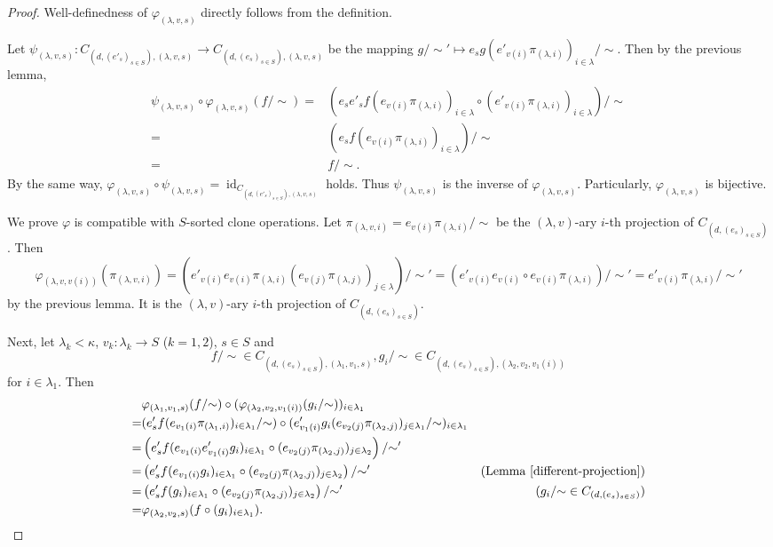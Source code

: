 \documentclass[a4paper,10pt]{article}
\theoremstyle{definition}
\newcommand\ph{\varphi}
\newcommand\ra{\rightarrow}
\DeclareMathOperator{\id}{id}
\newcommand\mc{\mathclose}
\begin{document}
\begin{proof}
Well-definedness of $\ph_{(\lambda,v,s)}$ directly follows from the definition.

Let $\psi_{(\lambda,v,s)}:C_{(d,(e'_s)_{s\in S}),(\lambda,v,s)}\ra
C_{(d,(e_s)_{s\in S}),(\lambda,v,s)}$ be the mapping
$g/\mc\sim'\mapsto e_sg(e'_{v(i)}\pi_{(\lambda,i)})_{i\in\lambda}/\mc\sim$.
Then by the previous lemma,
\begin{align*}
\psi_{(\lambda,v,s)}\circ \ph_{(\lambda,v,s)}(f/\mc\sim)
=&\left(e_se'_sf(e_{v(i)}\pi_{(\lambda,i)})_{i\in\lambda}
  \circ(e'_{v(i)}\pi_{(\lambda,i)})_{i\in\lambda}\right)/\mc\sim\\
=&\left(e_sf(e_{v(i)}\pi_{(\lambda,i)})_{i\in\lambda}\right)/\mc\sim\\
=&f/\mc\sim.
\end{align*}
By the same way,
$\ph_{(\lambda,v,s)}\circ \psi_{(\lambda,v,s)}=
\id_{C_{(d,(e'_s)_{s\in S}),(\lambda,v,s)}}$
holds. Thus $\psi_{(\lambda,v,s)}$ is the inverse of $\ph_{(\lambda,v,s)}$.
Particularly, $\ph_{(\lambda,v,s)}$ is bijective.


We prove $\ph$ is compatible with $S$-sorted clone operations.
Let $\pi_{(\lambda,v,i)}=e_{v(i)}\pi_{(\lambda,i)}/\mc\sim$ be the
$(\lambda,v)$-ary $i$-th projection of $C_{(d,(e_s)_{s\in S})}$.
Then
\[
\ph_{(\lambda,v,v(i))}(\pi_{(\lambda,v,i)})
=\left(e'_{v(i)}e_{v(i)}\pi_{(\lambda,i)}(e_{v(j)}\pi_{(\lambda,j)})_{j\in\lambda}\right)/\mc\sim'
=(e'_{v(i)}e_{v(i)}\circ e_{v(i)}\pi_{(\lambda,i)})/\mc\sim'
=e'_{v(i)}\pi_{(\lambda,i)}/\mc\sim'
\]
by the previous lemma.
It is the $(\lambda,v)$-ary $i$-th projection of $C_{(d,(e_s)_{s\in S})}$.

Next, let $\lambda_k<\kappa$, $v_k:\lambda_k\ra S$ ($k=1,2$),
$s\in S$ and 
\[
f/\mc\sim\in C_{(d,(e_s)_{s\in S}),(\lambda_1,v_1,s)},
g_i/\mc\sim\in C_{(d,(e_s)_{s\in S}),(\lambda_2,v_2,v_1(i))}
\]
for $i\in\lambda_1$.
Then
\begin{align*}
&\ph_{(\lambda_1,v_1,s)}(f/\mc\sim)
 \circ (\ph_{(\lambda_2,v_2,v_1(i))}(g_i/\mc\sim))_{i\in\lambda_1}&\\
=&(e'_sf(e_{v_1(i)}\pi_{(\lambda_1,i)})_{i\in\lambda_1}/\mc\sim)\circ 
 (e'_{v_1(i)}g_i(e_{v_2(j)}\pi_{(\lambda_2,j)})_{j\in\lambda_1}/\mc\sim)_{i\in\lambda_1}&\\
=&\left(e'_sf(e_{v_1(i)}e'_{v_1(i)}g_i)_{i\in\lambda_1}\circ 
  (e_{v_2(j)}\pi_{(\lambda_2,j)})_{j\in\lambda_2}\right)/\mc\sim'&\\
=&\left(e'_sf(e_{v_1(i)}g_i)_{i\in\lambda_1}\circ 
  (e_{v_2(j)}\pi_{(\lambda_2,j)})_{j\in\lambda_2}\right)/\mc\sim'
  &(\text{Lemma \ref{different-projection}})\\
=&\left(e'_sf(g_i)_{i\in\lambda_1}\circ 
  (e_{v_2(j)}\pi_{(\lambda_2,j)})_{j\in\lambda_2}\right)/\mc\sim'
  &(g_i/\mc\sim\in C_{(d,(e_s)_{s\in S})})\\
=&\ph_{(\lambda_2,v_2,s)}(f\circ (g_i)_{i\in\lambda_1}).&
\end{align*}
\end{proof}
\end{document}

